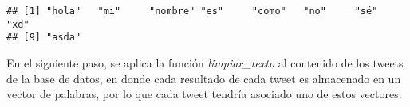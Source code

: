 \documentclass[
]{article}
\newenvironment{Shaded}{\begin{snugshade}}{\end{snugshade}}
\newcommand{\DataTypeTok}[1]{\textcolor[rgb]{0.13,0.29,0.53}{#1}}
\newcommand{\KeywordTok}[1]{\textcolor[rgb]{0.13,0.29,0.53}{\textbf{#1}}}
\newcommand{\NormalTok}[1]{#1}
\newcommand{\OperatorTok}[1]{\textcolor[rgb]{0.81,0.36,0.00}{\textbf{#1}}}
\newcommand{\StringTok}[1]{\textcolor[rgb]{0.31,0.60,0.02}{#1}}
\begin{document}
\begin{verbatim}
## [1] "hola"   "mi"     "nombre" "es"     "como"   "no"     "sé"     "xd"    
## [9] "asda"
\end{verbatim}

En el siguiente paso, se aplica la función \emph{limpiar\_texto} al
contenido de los tweets de la base de datos, en donde cada resultado de
cada tweet es almacenado en un vector de palabras, por lo que cada tweet
tendría asociado uno de estos vectores.

\begin{Shaded}
\end{Shaded}

\begin{Shaded}
\end{Shaded}
\end{document}
